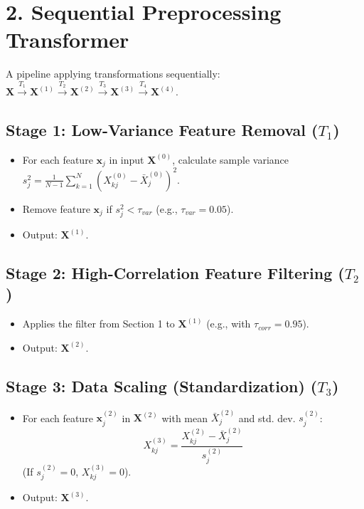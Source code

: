 \documentclass{article}
\newcommand{\mat}[1]{\mathbf{#1}} %
\newcommand{\vecbf}[1]{\bm{#1}} %
\begin{document}
\section*{2. Sequential Preprocessing Transformer}
A pipeline applying transformations sequentially: $\mat{X} \xrightarrow{T_1} \mat{X}^{(1)} \xrightarrow{T_2} \mat{X}^{(2)} \xrightarrow{T_3} \mat{X}^{(3)} \xrightarrow{T_4} \mat{X}^{(4)}$.

\subsection*{Stage 1: Low-Variance Feature Removal ($T_1$)}
\begin{itemize}
    \item For each feature $\vecbf{x}_j$ in input $\mat{X}^{(0)}$, calculate sample variance $s_j^2 = \frac{1}{N-1}\sum_{k=1}^{N} (X_{kj}^{(0)} - \bar{X}_j^{(0)})^2$.
    \item Remove feature $\vecbf{x}_j$ if $s_j^2 < \tau_{var}$ (e.g., $\tau_{var} = 0.05$).
    \item Output: $\mat{X}^{(1)}$.
\end{itemize}

\subsection*{Stage 2: High-Correlation Feature Filtering ($T_2$)}
\begin{itemize}
    \item Applies the filter from Section 1 to $\mat{X}^{(1)}$ (e.g., with $\tau_{corr} = 0.95$).
    \item Output: $\mat{X}^{(2)}$.
\end{itemize}

\subsection*{Stage 3: Data Scaling (Standardization) ($T_3$)}
\begin{itemize}
    \item For each feature $\vecbf{x}_j^{(2)}$ in $\mat{X}^{(2)}$ with mean $\bar{X}_j^{(2)}$ and std. dev. $s_j^{(2)}$:
    $$ X_{kj}^{(3)} = \frac{X_{kj}^{(2)} - \bar{X}_j^{(2)}}{s_j^{(2)}} $$
    (If $s_j^{(2)}=0$, $X_{kj}^{(3)}=0$).
    \item Output: $\mat{X}^{(3)}$.
\end{itemize}
\end{document}
